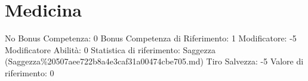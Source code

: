 \section{Medicina}\label{medicina}

\begin{description}
\tightlist
\item[Tags: ABI]
No Bonus Competenza: 0 Bonus Competenza di Riferimento: 1 Modificatore:
-5 Modificatore Abilità: 0 Statistica di riferimento: Saggezza
(Saggezza\%20507aee722b8a4e3caf31a00474cbe705.md) Tiro Salvezza: -5
Valore di riferimento: 0
\end{description}
